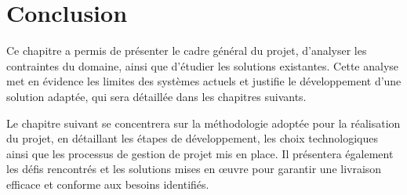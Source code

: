 \section*{Conclusion}

Ce chapitre a permis de présenter le cadre général du projet, d’analyser les contraintes du domaine, ainsi que d’étudier les solutions existantes. Cette analyse met en évidence les limites des systèmes actuels et justifie le développement d’une solution adaptée, qui sera détaillée dans les chapitres suivants.

Le chapitre suivant se concentrera sur la méthodologie adoptée pour la réalisation du projet, en détaillant les étapes de développement, les choix technologiques ainsi que les processus de gestion de projet mis en place. Il présentera également les défis rencontrés et les solutions mises en œuvre pour garantir une livraison efficace et conforme aux besoins identifiés.





